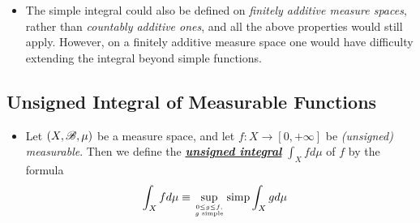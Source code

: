\documentclass[11pt]{article}
\begin{document}
\begin{itemize}
\item \begin{remark}
The simple integral could also be defined on \emph{finitely additive measure spaces}, rather than \emph{countably additive ones}, and all the above properties would still apply. However, on a finitely additive measure space one would have difficulty extending the integral beyond simple functions.
\end{remark}
\end{itemize}

\subsection{Unsigned Integral of Measurable Functions}
\begin{itemize}
\item \begin{definition}
Let $(X,{\mathscr B}, \mu)$ be a measure space, and let $f : X\rightarrow  [0,+\infty]$ be \emph{(unsigned) measurable}. Then we define the \underline{\emph{\textbf{unsigned integral}}} $\int_X f d\mu$ of $f$ by the formula
\begin{align*}
\int_{X}f d\mu &\equiv \sup\limits_{0\le g\le f, \atop g \text{ simple}} \text{simp}\int_{X}g d\mu
\end{align*}
\end{definition}


\end{itemize}
\end{document}
